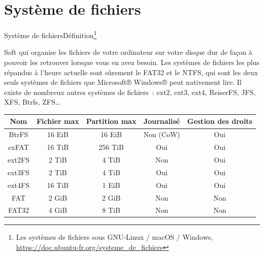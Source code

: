 \documentclass{beamer}
\begin{document}
    \section{Système de fichiers}\label{sec:fs}
    \begin{frame}{Système de fichiers}{Définition\footnote{\label{fs}Les systèmes de fichiers sous GNU-Linux / macOS / Windows, \url{https://doc.ubuntu-fr.org/systeme_de_fichiers}}}
        \begin{footnotesize}
            Soft qui organise les fichiers de votre ordinateur sur votre disque dur de façon
            à pouvoir les retrouver lorsque vous en avez besoin.
            Les systèmes de fichiers les plus répandus à l'heure actuelle sont sûrement le FAT32 et
            le NTFS, qui sont les deux seuls systèmes de fichiers que Microsoft® Windows® peut nativement lire.
            Il existe de nombreux autres systèmes de fichiers~: ext2, ext3, ext4, ReiserFS, JFS, XFS, Btrfs, ZFS\ldots
            \begin{table}[h!]
                \centering
                \begin{tabular}{|c|c|c|c|c|}
                    \hline
                    \textbf{Nom} & \textbf{Fichier max} & \textbf{Partition max} & \textbf{Journalisé} & \textbf{Gestion des droits} \\ \hline
                    BtrFS        & 16 EiB               & 16 EiB                 & Non (CoW)           & Oui                         \\ \hline
                    exFAT        & 16 TiB               & 256 TiB                & Oui                 & Oui                         \\ \hline
                    ext2FS       & 2 TiB                & 4 TiB                  & Non                 & Oui                         \\ \hline
                    ext3FS       & 2 TiB                & 4 TiB                  & Oui                 & Oui                         \\ \hline
                    ext4FS       & 16 TiB               & 1 EiB                  & Oui                 & Oui                         \\ \hline
                    FAT          & 2 GiB                & 2 GiB                  & Non                 & Non                         \\ \hline
                    FAT32        & 4 GiB                & 8 TiB                  & Non                 & Non                         \\ \hline

\end{tabular}
\end{table}
\end{footnotesize}
\end{frame}
\end{document}
